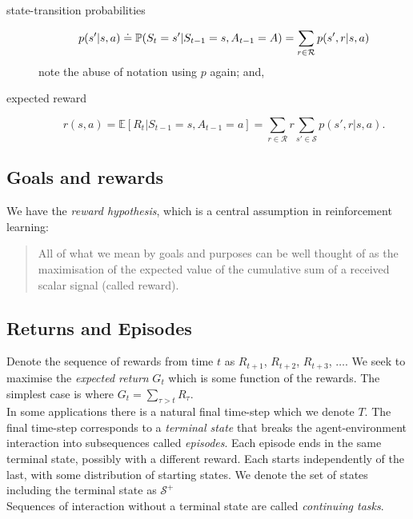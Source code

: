 \begin{description}
    \item[state-transition probabilities]
\begin{equation}
    p(s' | s, a) \doteq \P{}(S_t = s'| S_{t-1} = s, A_{t-1}=A) = \sum_{r \in \mathcal{R}} p(s', r | s, a)
\end{equation}
note the abuse of notation using $p$ again; and,
    \item[expected reward]
\begin{equation}
    r(s, a) = \mathbb{E}[R_t | S_{t-1} = s, A_{t-1} = a] = \sum_{r \in \mathcal{R}} r \sum_{s' \in \mathcal{S}} p(s', r | s, a).
\end{equation}
\end{description}


\subsection{Goals and rewards}
We have the \emph{reward hypothesis}, which is a central assumption in reinforcement learning:
\begin{quote}
    All of what we mean by goals and purposes can be well thought of as the maximisation of the expected value of the cumulative sum of a received scalar signal (called reward).
\end{quote}


\subsection{Returns and Episodes}
Denote the sequence of rewards from time $t$ as $R_{t+1}$, $R_{t+2}$, $R_{t+3}$, $\dots$. We seek to maximise the \emph{expected return} $G_t$ which is some function of the rewards. The simplest case is where $G_t = \sum_{\tau > t} R_\tau$.\\

In some applications there is a natural final time-step which we denote $T$. The final time-step corresponds to a \emph{terminal state} that breaks the agent-environment interaction into subsequences called \emph{episodes}. Each episode ends in the same terminal state, possibly with a different reward. Each starts independently of the last, with some distribution of starting states. We denote the set of states including the terminal state as $\mathcal{S}^+$\\

Sequences of interaction without a terminal state are called \emph{continuing tasks}. \\

